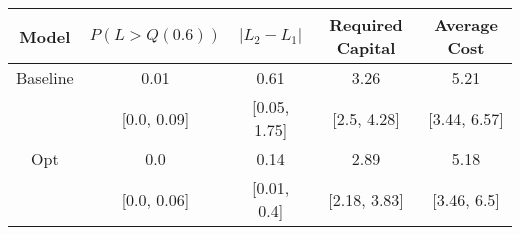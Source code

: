 \begin{tabular}{ccccc}
\toprule
   Model & $P(L > Q(0.6))$ & $|L_2 - L_1|$ & Required Capital & Average Cost \\
\midrule
Baseline &            0.01 &          0.61 &             3.26 &         5.21 \\
         &     [0.0, 0.09] &  [0.05, 1.75] &      [2.5, 4.28] & [3.44, 6.57] \\
     Opt &             0.0 &          0.14 &             2.89 &         5.18 \\
         &     [0.0, 0.06] &   [0.01, 0.4] &     [2.18, 3.83] &  [3.46, 6.5] \\
\bottomrule
\end{tabular}
